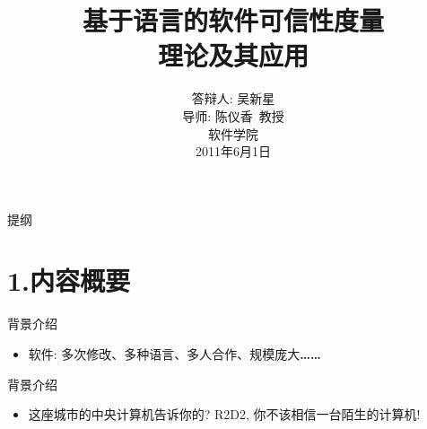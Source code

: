 \documentclass[												
size=10pt,															
paper=screen,														
mode=present,														
orient=landscape,
clock=true,															
style=chenandwu		
]{powerdot}
\begin{document}
\begin{CJK*}{GBK}{song}
\title{\LARGE{\textbf{基于语言的软件可信性度量}\\\textbf{理论及其应用}} \\[1.5em]
}		
\author{答辩人: 吴新星 \\[0.6em]
导师: 陈仪香\, 教授\\[1.8em]
\small{软件学院} \\[0.6em]
\small{2011年6月1日}\\[0.9em]
\date{}
}	
\maketitle												
\begin{slide}{提纲}	
\tableofcontents[content=sections]
\end{slide}															
\section{1.内容概要}	
\begin{slide}{背景介绍}
\begin{itemize}
\item{软件: 多次修改、多种语言、多人合作、规模庞大\textbf{\ldots\ldots}{\footnotemark[1]}}

\end{itemize}
{}
\end{slide}
\begin{slide}[toc=,bm=]{背景介绍}
\begin{itemize}
\item 这座城市的中央计算机告诉你的? R2D2, 你不该相信一台陌生的计算机!
\end{itemize}
\end{slide}

\end{CJK*}
\end{document}
